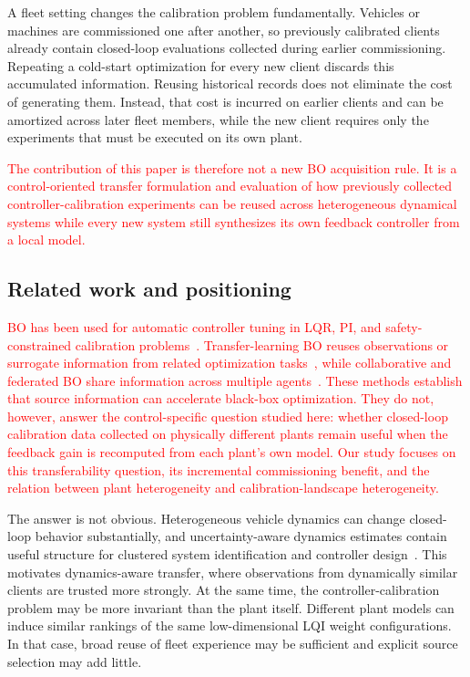\documentclass[conference]{IEEEtran}
\newcommand{\rev}[1]{\textcolor{red}{#1}}
\begin{document}
A fleet setting changes the calibration problem fundamentally. Vehicles or machines are commissioned one after another, so previously calibrated clients already contain closed-loop evaluations collected during earlier commissioning. Repeating a cold-start optimization for every new client discards this accumulated information. Reusing historical records does not eliminate the cost of generating them. Instead, that cost is incurred on earlier clients and can be amortized across later fleet members, while the new client requires only the experiments that must be executed on its own plant.

\rev{The contribution of this paper is therefore not a new BO acquisition rule. It is a control-oriented transfer formulation and evaluation of how previously collected controller-calibration experiments can be reused across heterogeneous dynamical systems while every new system still synthesizes its own feedback controller from a local model.}

\subsection{Related work and positioning}
\rev{BO has been used for automatic controller tuning in LQR, PI, and safety-constrained calibration problems~\cite{marco2016lqr,berkenkamp2016safe,schillinger2017safe,vonrohr2024local}. Transfer-learning BO reuses observations or surrogate information from related optimization tasks~\cite{joy2019transfer,tighineanu2022transfer,perrone2018scalable}, while collaborative and federated BO share information across multiple agents~\cite{dai2020fts,dai2021dpfts,chen2025collaborative}. These methods establish that source information can accelerate black-box optimization. They do not, however, answer the control-specific question studied here: whether closed-loop calibration data collected on physically different plants remain useful when the feedback gain is recomputed from each plant's own model. Our study focuses on this transferability question, its incremental commissioning benefit, and the relation between plant heterogeneity and calibration-landscape heterogeneity.}

The answer is not obvious. Heterogeneous vehicle dynamics can change closed-loop behavior substantially, and uncertainty-aware dynamics estimates contain useful structure for clustered system identification and controller design~\cite{weber2026ifac}. This motivates dynamics-aware transfer, where observations from dynamically similar clients are trusted more strongly. At the same time, the controller-calibration problem may be more invariant than the plant itself. Different plant models can induce similar rankings of the same low-dimensional LQI weight configurations. In that case, broad reuse of fleet experience may be sufficient and explicit source selection may add little.
\end{document}
